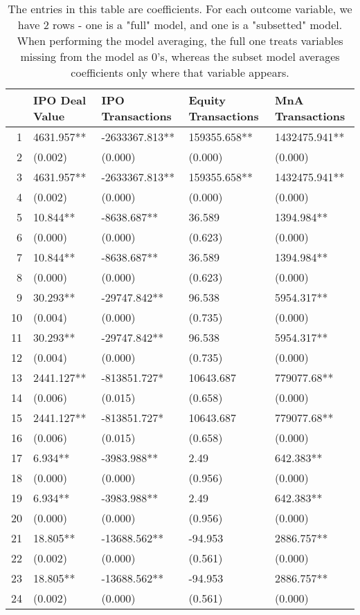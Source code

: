 \begin{table}[ht]
\centering
\begin{tabular}{rllll}
  \hline
 & IPO Deal Value & IPO Transactions & Equity Transactions & MnA Transactions \\ 
  \hline
1 & 4631.957** & -2633367.813** & 159355.658** & 1432475.941** \\ 
  2 & (0.002) & (0.000) & (0.000) & (0.000) \\ 
  3 & 4631.957** & -2633367.813** & 159355.658** & 1432475.941** \\ 
  4 & (0.002) & (0.000) & (0.000) & (0.000) \\ 
  5 & 10.844** & -8638.687** & 36.589 & 1394.984** \\ 
  6 & (0.000) & (0.000) & (0.623) & (0.000) \\ 
  7 & 10.844** & -8638.687** & 36.589 & 1394.984** \\ 
  8 & (0.000) & (0.000) & (0.623) & (0.000) \\ 
  9 & 30.293** & -29747.842** & 96.538 & 5954.317** \\ 
  10 & (0.004) & (0.000) & (0.735) & (0.000) \\ 
  11 & 30.293** & -29747.842** & 96.538 & 5954.317** \\ 
  12 & (0.004) & (0.000) & (0.735) & (0.000) \\ 
  13 & 2441.127** & -813851.727* & 10643.687 & 779077.68** \\ 
  14 & (0.006) & (0.015) & (0.658) & (0.000) \\ 
  15 & 2441.127** & -813851.727* & 10643.687 & 779077.68** \\ 
  16 & (0.006) & (0.015) & (0.658) & (0.000) \\ 
  17 & 6.934** & -3983.988** & 2.49 & 642.383** \\ 
  18 & (0.000) & (0.000) & (0.956) & (0.000) \\ 
  19 & 6.934** & -3983.988** & 2.49 & 642.383** \\ 
  20 & (0.000) & (0.000) & (0.956) & (0.000) \\ 
  21 & 18.805** & -13688.562** & -94.953 & 2886.757** \\ 
  22 & (0.002) & (0.000) & (0.561) & (0.000) \\ 
  23 & 18.805** & -13688.562** & -94.953 & 2886.757** \\ 
  24 & (0.002) & (0.000) & (0.561) & (0.000) \\ 
   \hline
\end{tabular}
\caption{The entries in this table are coefficients. For each outcome variable, 
                  we have 2 rows - one is a "full" model, and one is a "subsetted" model.
                  When performing the model averaging, the full one treats variables missing from the model as 0's,
                  whereas the subset model averages coefficients only where that variable appears.} 
\end{table}
